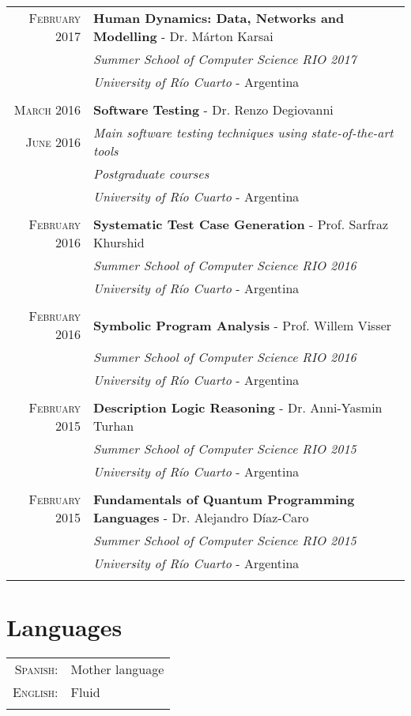 \documentclass[a4paper,10pt]{article} %
\begin{document}
\begin{longtable}{rl}
\textsc{February} 2017 & \textbf{Human Dynamics: Data, Networks and Modelling} - Dr. Márton Karsai \\
& \textit{Summer School of Computer Science RIO 2017} \\
& \textit{University of Río Cuarto} - Argentina \\ & \\

\textsc{March} 2016 & \textbf{Software Testing} - Dr. Renzo Degiovanni \\
\textsc{June} 2016 & \textit{Main software testing techniques using state-of-the-art tools} \\
& \textit{Postgraduate courses} \\
& \textit{University of Río Cuarto} - Argentina \\ & \\

\textsc{February} 2016 & \textbf{Systematic Test Case Generation} - Prof. Sarfraz Khurshid \\
& \textit{Summer School of Computer Science RIO 2016} \\
& \textit{University of Río Cuarto} - Argentina \\ & \\

\textsc{February} 2016 & \textbf{Symbolic Program Analysis} - Prof. Willem Visser \\
& \textit{Summer School of Computer Science RIO 2016} \\
& \textit{University of Río Cuarto} - Argentina \\ & \\

\textsc{February} 2015 & \textbf{Description Logic Reasoning} - Dr. Anni-Yasmin Turhan\\
& \textit{Summer School of Computer Science RIO 2015} \\
& \textit{University of Río Cuarto} - Argentina \\ & \\

\textsc{February} 2015 & \textbf{Fundamentals of Quantum Programming Languages} - Dr. Alejandro Díaz-Caro \\
& \textit{Summer School of Computer Science RIO 2015} \\
& \textit{University of Río Cuarto} - Argentina \\ & \\

\end{longtable}

\section{Languages}
\begin{tabular}{rl}
\\
\textsc{Spanish:} & Mother language\\
\textsc{English:} & Fluid \\ & \\
\end{tabular}
\end{document}
